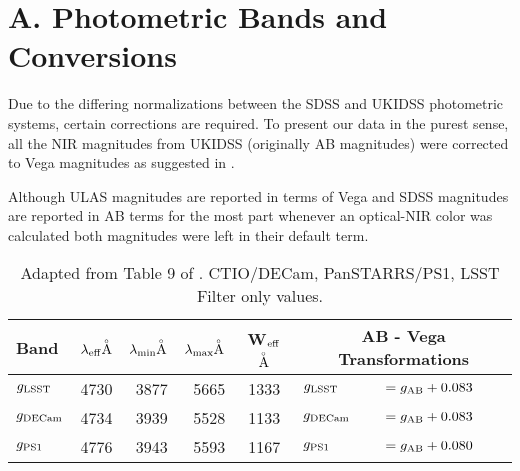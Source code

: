 \documentclass[usenatbib]{mnras}
\begin{document}
\section{A. Photometric Bands and Conversions}
    Due to the differing normalizations between the
    SDSS and  UKIDSS photometric systems, certain corrections are required.  To present
    our data in the  purest sense, all the NIR magnitudes from UKIDSS
    (originally AB magnitudes)  were corrected to Vega magnitudes as
    suggested in \citet{Hewett06}.
    
    Although ULAS magnitudes are reported in terms of Vega and SDSS
    magnitudes are reported in AB terms for the most part whenever an
    optical-NIR color was calculated both magnitudes were left in their
    default term.
    
\begin{table*}[h*]
  \begin{center}
   \caption{Adapted from Table 9 of \citet{Peth11}. 
CTIO/DECam, PanSTARRS/PS1, LSST
Filter only values. 
}
    \setlength{\tabcolsep}{4pt}
     \begin{tabular}{l r r r  c l l}
      \hline
      \hline
      Band & $\lambda_{\rm eff}  {\buildrel _{\circ} \over {\mathrm{A}}}$ 
              &  $\lambda_{\rm min} {\buildrel _{\circ} \over {\mathrm{A}}}$ 
              & $\lambda_{\rm max} {\buildrel _{\circ} \over {\mathrm{A}}}$ 
              & W$_{\rm eff}$ ${\buildrel _{\circ} \over {\mathrm{A}}}$ 
              & \multicolumn{2}{c}{AB - Vega  Transformations} \\
      \hline
      $g_{\rm LSST}$      &     4730     &	  3877    &	   5665   &  1333   &  $g_{\rm LSST}$       &$ = g_{\rm AB} +  0.083 $ \\   %
      $g_{\rm DECam}$  &      4734     &   3939    &    5528   &   1133        &  $g_{\rm DECam} $    &$  = g_{\rm AB} + 0.083 $ \\	     
      $g_{\rm PS1}$        &    4776    &    3943    &    5593   &   1167        &  $g_{\rm PS1}$         &$  = g_{\rm AB} + 0.080 $ \\   %

\end{tabular}
\end{center}
\end{table*}
\end{document}

